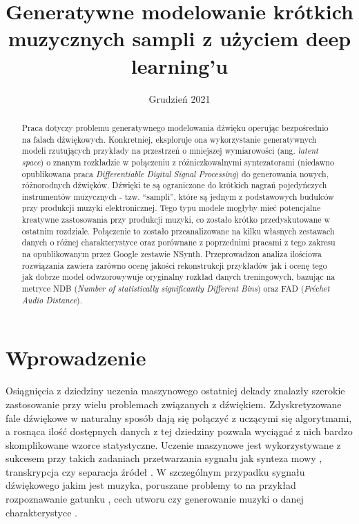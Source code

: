 \documentclass[magisterska]{pracamgr}
\title{Generatywne modelowanie krótkich muzycznych sampli z użyciem deep learning'u}
\date{Grudzień 2021}
\begin{document}
\maketitle

\begin{abstract}
  Praca dotyczy problemu generatywnego modelowania dźwięku operując bezpośrednio na falach dźwiękowych. Konkretniej, eksploruje ona wykorzystanie generatywnych modeli rzutujących przykłady na przestrzeń o mniejszej wymiarowości (ang. \textit{latent space}) o znanym rozkładzie w połączeniu z różniczkowalnymi syntezatorami (niedawno opublikowana praca \textit{Differentiable Digital Signal Processing}) do generowania nowych, różnorodnych dźwięków. Dźwięki te są ograniczone do krótkich nagrań pojedyńczych instrumentów muzycznych - tzw. "`sampli"', które są jednym z podstawowych budulców przy produkcji muzyki elektronicznej. Tego typu modele mogłyby mieć potencjalne kreatywne zastosowania przy produkcji muzyki, co zostało krótko przedyskutowane w ostatnim rozdziale. Połączenie to zostało przeanalizowane na kilku własnych zestawach danych o różnej charakterystyce oraz porównane z poprzednimi pracami z tego zakresu na opublikowanym przez Google zestawie NSynth. Przeprowadzon analiza ilościowa rozwiązania zawiera zarówno ocenę jakości rekonstrukcji przykładów jak i ocenę tego jak dobrze model odwzorowywuje oryginalny rozkład danych treningowych, bazując na metryce NDB (\textit{Number of statistically significantly Different Bins}) oraz FAD (\textit{Fréchet Audio Distance}).
\end{abstract}

\tableofcontents


\chapter*{Wprowadzenie}\label{r:pojecia}

Osiągnięcia z dziedziny uczenia maszynowego ostatniej dekady znalazły szerokie zastosowanie przy wielu problemach związanych z dźwiękiem. Zdyskretyzowane fale dźwiękowe w naturalny sposób dają się połączyć z uczącymi się algorytmami, a rosnąca ilość dostępnych danych z tej dziedziny pozwala wyciągać z nich bardzo skomplikowane wzorce statystyczne. Uczenie maszynowe jest wykorzystywane z sukcesem przy takich zadaniach przetwarzania sygnału jak synteza mowy \cite{shen2018natural} \cite{donahue2021endtoend}, transkrypcja \cite{baevski2020wav2vec} czy separacja źródeł \cite{defossez2021hybrid}. W szczególnym przypadku sygnału dźwiękowego jakim jest muzyka, poruszane problemy to na przykład rozpoznawanie gatunku \cite{castellon2021codified}, cech utworu \cite{castellon2021codified} czy generowanie muzyki o danej charakterystyce \cite{dhariwal2020jukebox}.
\end{document}
